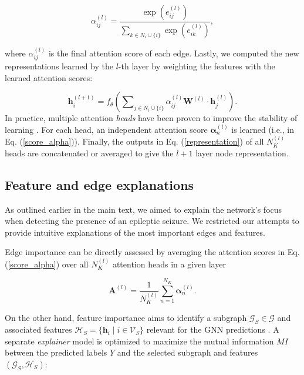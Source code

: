 \documentclass[a4paper,fleqn]{cas-sc}
\begin{document}
\begin{equation} \label{score_alpha}
    \alpha_{ij}^{(l)} = \frac{\exp\left(e_{ij}^{(l)}\right)}{\sum_{k \in N_i\cup\{i\}} \exp\left(e_{ik}^{(l)}\right)},
\end{equation}

where $\alpha_{ij}^{(l)}$ is the final attention score of each edge. Lastly, we computed the new representations learned by the $l$-th layer by weighting the features with the learned attention scores: 

\begin{equation} \label{representation}
    \textbf{h}_{i}^{(l+1)} = f_{\theta}\left( \sum\nolimits_{j \in N_i \cup\{i\}} \alpha_{ij}^{(l)} \mathbf{W}^{(l)} \cdot \mathbf{h}_{j}^{(l)} \right).
\end{equation}
In practice, multiple attention \textit{heads} have been proven to improve the stability of learning \cite{velickovic2018graph,brody2021gatv2}. For each head, an independent attention score $\bm{\alpha}_n^{(l)}$ is learned (i.e., in Eq. (\ref{score_alpha})). Finally, the outputs in Eq. (\ref{representation}) of all $N_K^{(l)}$ heads are concatenated or averaged to give the $l+1$ layer node representation.

\subsection{Feature and edge explanations}
As outlined earlier in the main text, we aimed to explain the network's focus when detecting the presence of an epileptic seizure. We restricted our attempts to provide intuitive explanations of the most important edges and features.

Edge importance can be directly assessed by averaging the attention scores in Eq. (\ref{score_alpha}) over all $N_K^{(l)}$ attention heads in a given layer 

\begin{equation} \label{edge_explain}
    \mathbf{A}^{(l)} = \frac{1}{N_K^{(l)}} \sum_{n=1}^{N_K}  \bm{\alpha}_{n}^{(l)}.
\end{equation}

On the other hand, feature importance aims to identify a subgraph $\mathcal{G}_{S} \in \mathcal{G}$ and associated features $\mathcal{H}_{S} = \{ \mathbf{h}_i \mid i \in \mathcal{V}_{S} \}$ relevant for the GNN predictions \cite{Ying2019GnnX}. A separate \textit{explainer} model is optimized to maximize the mutual information $MI$ between the predicted labels $Y$ and the selected subgraph and features $(\mathcal{G}_S,\mathcal{H}_S)$: 
\end{document}
